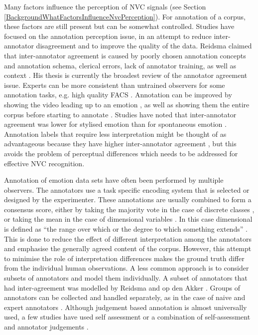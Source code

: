 Many factors influence the perception of \ac{NVC} signals (see Section \ref{BackgroundWhatFactorsInfluenceNvcPerception}). For annotation of a corpus, these factors are still present but can be somewhat controlled. Studies have focused on the annotation perception issue, in an attempt to reduce inter-annotator disagreement and to improve the quality of the data. Reidsma claimed that inter-annotator agreement is caused by poorly chosen annotation concepts and annotation schema, clerical errors, lack of annotator training, as well as context \cite{Reidsma2008}. His thesis is currently the broadest review of the annotator agreement issue. Experts can be more consistent than untrained observers for some annotation tasks, e.g. high quality \ac{FACS} \cite{Donato1999}. Annotation can be improved by showing the video leading up to an emotion \cite{ElKaliouby03}, as well as showing them the entire corpus before starting to annotate \cite{Hoque2009}. Studies have noted that inter-annotator agreement was lower for stylised emotion than for spontaneous emotion \cite{Bernhardt07, Afzal2009b}. Annotation labels that require less interpretation might be thought of as advantageous because they have higher inter-annotator agreement \cite{Fasel2003}, but this avoids the problem of perceptual differences which needs to be addressed for effective \ac{NVC} recognition.

Annotation of emotion data sets have often been performed by multiple observers. The annotators use a task specific encoding system that is selected or designed by the experimenter. These annotations are usually combined to form a consensus score, either by taking the majority vote in the case of discrete classes \cite{Seppi2008, Escalera2009}, or taking the mean in the case of dimensional variables \cite{Wollmer2008, Mower2009}. In this case dimensional is defined as ``the range over which or the degree to which something extends'' \cite{merriamwebster}. This is done to reduce the effect of different interpretation among the annotators and emphasise the generally agreed content of the corpus. However, this attempt to minimise the role of interpretation differences makes the ground truth differ from the individual human observations. A less common approach is to consider subsets of annotators and model them individually. A subset of annotators that had inter-agreement was modelled by Reidsma and op den Akker \cite{Reidsma2008b}. Groups of annotators can be collected and handled separately, as in the case of naive and expert annotators \cite{Donato1999}. Although judgement based annotation is almost universally used, a few studies have used self assessment \cite{Madan2005} or a combination of self-assessment and annotator judgements \cite{Hoque2009}. 

